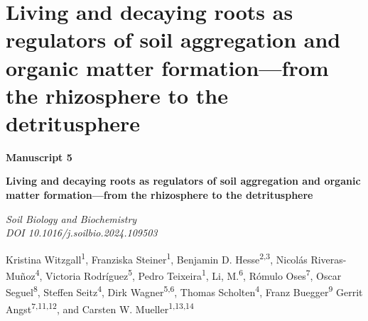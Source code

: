 \chapter{Living and decaying roots as regulators of soil aggregation and organic matter formation---from the rhizosphere to the detritusphere}
\label{chap:manuscript5} %

\begin{center}
  \textbf{\Large Manuscript 5}
\end{center}  
\vspace{0.1cm}
\begin{center}
  \textbf{\huge Living and decaying roots as regulators of soil aggregation and organic matter formation---from the rhizosphere to the detritusphere}
\end{center}  
\vspace{0.2cm}
\begin{center}
  \textit{Soil Biology and Biochemistry}\\
  \textit{DOI 10.1016/j.soilbio.2024.109503}
\end{center}
\vspace{0.1cm}
    
\begin{justify}
    Kristina Witzgall\textsuperscript{1}, Franziska Steiner\textsuperscript{1}, Benjamin D. Hesse\textsuperscript{2,3}, Nicolás Riveras-Muñoz\textsuperscript{4}, Victoria Rodríguez\textsuperscript{5}, Pedro Teixeira\textsuperscript{1}, Li, M.\textsuperscript{6}, Rómulo Oses\textsuperscript{7}, Oscar Seguel\textsuperscript{8}, Steffen Seitz\textsuperscript{4}, Dirk Wagner\textsuperscript{5,6}, Thomas Scholten\textsuperscript{4}, Franz Buegger\textsuperscript{9} Gerrit Angst\textsuperscript{7,11,12}, and Carsten W. Mueller\textsuperscript{1,13,14}
\end{justify}

\vspace{0.2cm}

